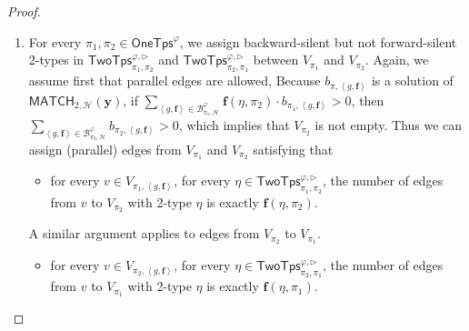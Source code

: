 \documentclass[10pt,a4paper]{article}
\theoremstyle{definition}
\theoremstyle{remark}
\newcommand{\cB}{\mathcal{B}}
\newcommand{\cH}{\mathcal{H}}
\newcommand{\cK}{\mathsf{TwoTps}}
\newcommand{\bff}{\mathbf{f}}
\newcommand{\bfy}{\mathbf{y}}
\newcommand{\onetypes}{\mathsf{OneTps}}
\newcommand{\tuple}[1]       {\left\langle #1 \right\rangle}
\newcommand{\trif} {\triangleright}
\newcommand{\cKvpf}     {\cK^{\varphi, \trif}}
\newcommand{\match} {\mathsf{MATCH}}
\begin{document}
\begin{proof}
\begin{enumerate}
        \item
            For every $\pi_1, \pi_2 \in \onetypes^\varphi$,
            we assign backward-silent but not forward-silent 2-types in $\cKvpf_{\pi_1, \pi_2}$ and $\cKvpf_{\pi_2, \pi_1}$
            between $V_{\pi_1}$ and $V_{\pi_2}$.
            Again, we assume first that parallel edges are allowed,
            Because $b_{\pi, \tuple{g, \bff}}$ is a solution of $\match_{2, \cH}(\bfy)$,
            if $\sum_{\tuple{g, \bff} \in \cB^\varphi_{\pi_1, \cH}} \bff(\eta, \pi_2) \cdot b_{\pi_1, \tuple{g, \bff}} > 0$,
            then $\sum_{\tuple{g, \bff} \in \cB^\varphi_{\pi_2, \cH}} b_{\pi_2, \tuple{g, \bff}} > 0$,
            which implies that $V_{\pi_2}$ is not empty.
            Thus we can assign (parallel) edges from $V_{\pi_1}$ and $V_{\pi_2}$ satisfying that
            \begin{itemize}
            \item
                for every $v \in V_{\pi_1, \tuple{g, \bff}}$, for every $\eta \in \cKvpf_{\pi_1, \pi_2}$,
                the number of edges from $v$ to $V_{\pi_2}$ with 2-type $\eta$ is exactly $\bff(\eta, \pi_2)$.
            \end{itemize}
            A similar argument applies to edges from $V_{\pi_2}$ to $V_{\pi_1}$.
            \begin{itemize}
            \item
                for every $v \in V_{\pi_2, \tuple{g, \bff}}$, for every $\eta \in \cKvpf_{\pi_2, \pi_1}$,
                the number of edges from $v$ to $V_{\pi_1}$ with 2-type $\eta$ is exactly $\bff(\eta, \pi_1)$.
            \end{itemize}


\end{enumerate}
\end{proof}
\end{document}
